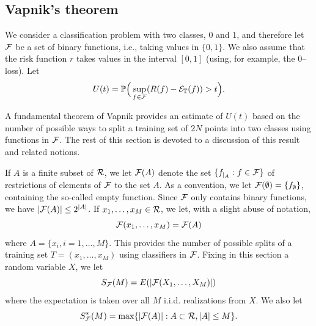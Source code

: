 \subsection{Vapnik's theorem}

We consider a classification problem with two classes, 0 and 1, and therefore let ${\mathcal F}$ be a set of binary functions, i.e., taking values in $\{0,1\}$. We also assume that the risk function $r$ takes values in the interval $[0,1]$ (using, for example, the 0-- loss).
Let
\begin{equation}
\label{eq:ut}
U(t) = \bm{\mathbb P}\Big(\sup_{f\in{\mathcal F}} (R(f) - {\mathcal E}_{\mathbb T}(f)) > t\Big).
\end{equation}

A fundamental theorem of Vapnik  provides an estimate of $U(t)$ based on the
number of possible ways to split a training set of $2N$ points into two
classes using functions in ${\mathcal F}$. The rest of this section is devoted to a discussion of this result and related notions. 

If $A$ is a finite subset of ${\mathcal R}$, we let ${\mathcal F}(A)$ denote the set $\{f_{|_A}: f \in {\mathcal F}\}$ of restrictions of elements of ${\mathcal F}$ to the set $A$. As a convention, we let ${\mathcal F}(\emptyset) = \{f_\emptyset\}$, containing the so-called empty function.
Since ${\mathcal F}$ only contains binary functions, we have $|{\mathcal F}(A)| \leq 2^{|A|}$. If $x_1, \ldots, x_M\in {\mathcal R}$, we let, with a slight abuse of notation,
\[
{\mathcal F}(x_1, \ldots, x_M) = {\mathcal F}(A)
 \]
 where $A = \{x_i, i=1, \ldots, M\}$.
 This provides the number of possible splits of a training set  $T = (x_1, \ldots, x_M)$ using classifiers in ${\mathcal F}$. Fixing in this section a random variable $X$, we let
\[
S_{\mathcal F}(M) = E(|{\mathcal F}(X_1, \ldots, X_M)|)
\]
where
 the expectation is taken over all
$M$ i.i.d. realizations  from $X$. 
We also let
\[
S_{\mathcal F}^*(M) = \max\{ |{\mathcal F}(A)|: A\subset{\mathcal R}, |A| \leq M\}.
\]

